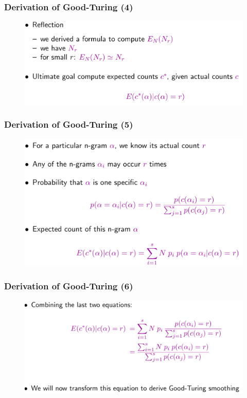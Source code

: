 \documentclass{beamer}
\begin{document}
\begin{frame}\frametitle{Derivation of Good-Turing (4)}
\begin{figure}
\includegraphics[width=0.9\linewidth]{figure/derivation_good_turing_4.pdf}
\end{figure}
\end{frame}


\begin{frame}\frametitle{Derivation of Good-Turing (5)}
\begin{figure}
\includegraphics[width=0.9\linewidth]{figure/derivation_good_turing_5.pdf}
\end{figure}
\end{frame}


\begin{frame}\frametitle{Derivation of Good-Turing (6)}
\begin{figure}
\includegraphics[width=0.9\linewidth]{figure/derivation_good_turing_6.pdf}
\end{figure}
\end{frame}
\end{document}
